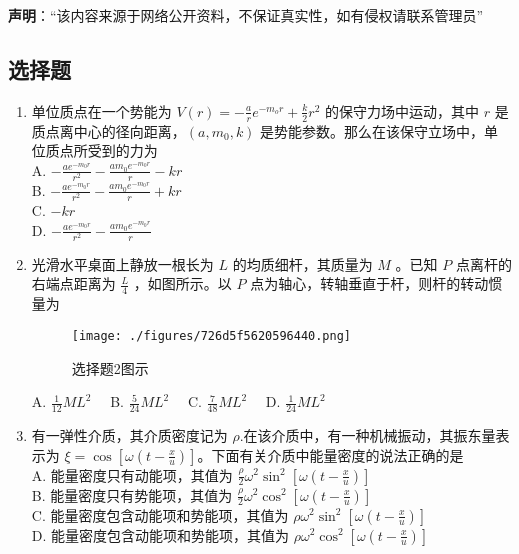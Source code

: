 
\textbf{声明}：“该内容来源于网络公开资料，不保证真实性，如有侵权请联系管理员”

\subsection{选择题}
\begin{enumerate}
\item 单位质点在一个势能为 $V(r) = -\frac{a}{r}e^{-m_{o}r}+\frac{k}{2}r^{2}$ 的保守力场中运动，其中 $r$ 是质点离中心的径向距离，$(a,m_{0},k)$ 是势能参数。那么在该保守立场中，单位质点所受到的力为\\
A. $-\frac{ae^{-m_{0}r}}{r^{2}}-\frac{am_{0}e^{-m_{0}r}}{r}-kr$\\
B. $-\frac{ae^{-m_{0}r}}{r^{2}}-\frac{am_{0}e^{-m_{0}r}}{r}+kr$\\
C. $-kr$\\
D. $-\frac{ae^{-m_{0}r}}{r^{2}}-\frac{am_{0}e^{-m_{0}r}}{r}$\\

\item 光滑水平桌面上静放一根长为 $L$ 的均质细杆，其质量为 $M$ 。已知 $P$ 点离杆的右端点距离为 $\frac{L}{4}$ ，如图所示。以 $P$ 点为轴心，转轴垂直于杆，则杆的转动惯量为\\
\begin{figure}[ht]
\centering
\texttt{[image: ./figures/726d5f5620596440.png]}
\caption{选择题2图示} \label{fig_CAS17_1}
\end{figure}
A. $\frac{1}{12}ML^{2} \quad$
B. $\frac{5}{24}ML^{2} \quad$
C. $\frac{7}{48}ML^{2} \quad$
D. $\frac{1}{24}ML^{2} \quad$

\item 有一弹性介质，其介质密度记为 $\rho$.在该介质中，有一种机械振动，其振东量表示为 $\xi = \cos{[\omega(t-\frac{x}{u})]}$。下面有关介质中能量密度的说法正确的是\\
A. 能量密度只有动能项，其值为 $\frac{\rho}{2}\omega^{2}\sin^{2}{[\omega(t-\frac{x}{u})]}$\\
B. 能量密度只有势能项，其值为 $\frac{\rho}{2}\omega^{2}\cos^{2}{[\omega(t-\frac{x}{u})]}$\\
C. 能量密度包含动能项和势能项，其值为 $\rho\omega^{2}\sin^{2}{[\omega(t-\frac{x}{u})]}$\\
D. 能量密度包含动能项和势能项，其值为 $\rho\omega^{2}\cos^{2}{[\omega(t-\frac{x}{u})]}$\\


\end{enumerate}
